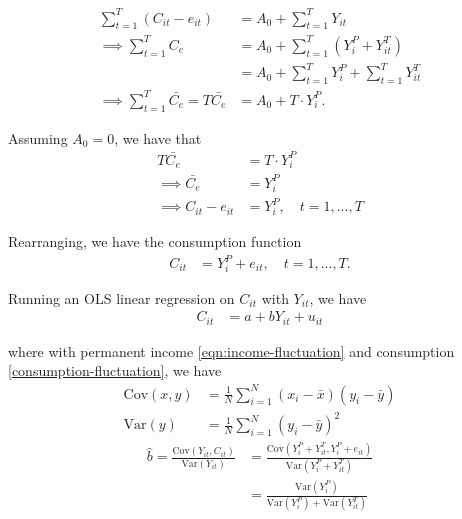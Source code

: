 \documentclass{article}
\newcommand{\cov}[1]{\mathrm{Cov}\left(#1\right)}
\newcommand{\var}[1]{\mathrm{Var}\left(#1\right)}
\begin{document}
        \begin{align}
            \sum_{t=1}^T \left(C_{it} - e_{it}\right)
            &= A_0 + \sum_{t=1}^T Y_{it}
            \\ \implies
            \sum_{t=1}^T C_e
            &= A_0 + \sum_{t=1}^T (Y_{i}^P + Y_{it}^T)
            \\
            &= A_0 + \sum_{t=1}^T Y_{i}^P + \sum_{t=1}^T Y_{it}^T
            \\ \implies
            \sum_{t=1}^T \bar{C_e}
            = T \bar{C_e}
            &= A_0 + T \cdot Y_{i}^P.
        \end{align}
        
        Assuming $A_0 = 0$, we have that
        \begin{align}
            T \bar{C_e} &= T \cdot Y_{i}^P
            \\
            \implies 
            \bar{C_e} &= Y_{i}^P
            \\
            \implies
            C_{it} - e_{it} &= Y_{i}^P, \quad t = 1, ..., T
        \end{align}    
        
        Rearranging, we have the consumption function
        \begin{align}
            C_{it} &= Y_{i}^P + e_{it}, \quad t = 1, ..., T.
            \label{consumption-fluctuation}
        \end{align}
    
        Running an OLS linear regression on $C_{it}$ with $Y_{it}$, we have
        \begin{align}
            C_{it} &= a + b Y_{it} + u_{it}
            \label{eqn:consumption-regression}
        \end{align}
        
        where with permanent income \eqref{eqn:income-fluctuation} and consumption \eqref{consumption-fluctuation}, we have
        \begin{align}
            \cov{x, y} &= \frac{1}{N}\sum_{i=1}^N(x_i - \bar{x})(y_i - \bar{y}) \\
            \var{y} &= \frac{1}{N}\sum_{i=1}^N(y_i - \bar{y})^2
        \end{align}
        \begin{align}
            \hat{b}
            = \frac{ \cov{Y_{it}, C_{it}} }{ \var{Y_{it}} }
            &= \frac{ \cov{Y_{i}^P + Y_{it}^T, Y_{i}^P + e_{it}} }{ \var{Y_{i}^P + Y_{it}^T} }
            \\
            &= \frac{ \var{Y_{i}^P} }{ \var{Y_{i}^P} + \var{Y_{it}^T} }
            \label{eqn:regression-bhat}
        \end{align}
        
\end{document}
